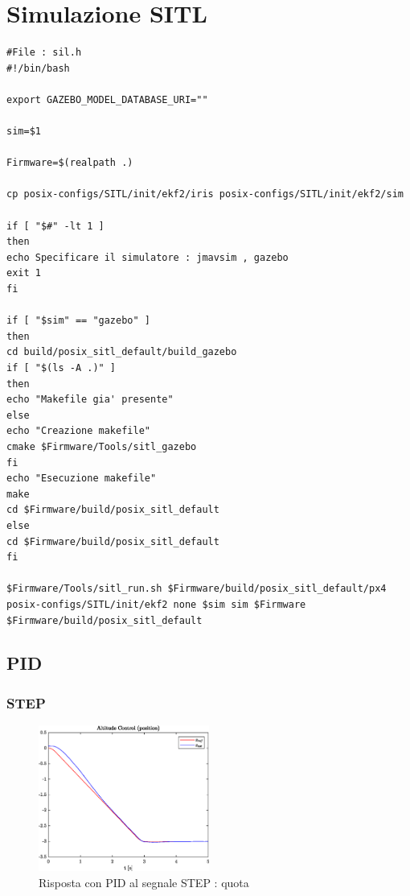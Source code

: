 \section{Simulazione SITL}

\begin{lstlisting}
#File : sil.h
#!/bin/bash

export GAZEBO_MODEL_DATABASE_URI=""

sim=$1

Firmware=$(realpath .)

cp posix-configs/SITL/init/ekf2/iris posix-configs/SITL/init/ekf2/sim

if [ "$#" -lt 1 ]
then
echo Specificare il simulatore : jmavsim , gazebo
exit 1
fi

if [ "$sim" == "gazebo" ] 
then
cd build/posix_sitl_default/build_gazebo
if [ "$(ls -A .)" ]
then
echo "Makefile gia' presente"
else
echo "Creazione makefile"
cmake $Firmware/Tools/sitl_gazebo
fi
echo "Esecuzione makefile"
make
cd $Firmware/build/posix_sitl_default
else
cd $Firmware/build/posix_sitl_default
fi

$Firmware/Tools/sitl_run.sh $Firmware/build/posix_sitl_default/px4  posix-configs/SITL/init/ekf2 none $sim sim $Firmware $Firmware/build/posix_sitl_default
\end{lstlisting}

\subsection{PID}
\subsubsection{STEP}
\begin{figure}
	\centering
	\includegraphics[width=0.5\textwidth]{Simulazioni/Figure/PID/STEP/AltitudeControlPos}
	\caption{Risposta con PID al segnale STEP : quota}
\end{figure}

